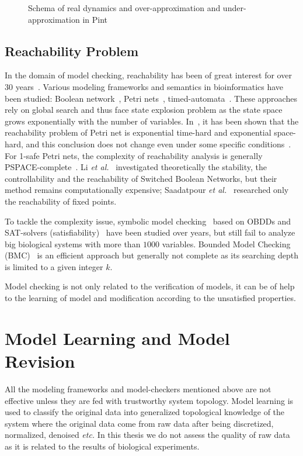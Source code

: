 \begin{figure}[ht]
    \centering
    
    \caption[Static analysis]{Schema of real dynamics and over-approximation and under-approximation in Pint}
    \label{fig:vennDiagram}
\end{figure}

\subsection{Reachability Problem}
In the domain of model checking, reachability has been of great interest for over 30 years~\cite{clarke2008birth,clarke20142}. 
Various modeling frameworks and semantics in bioinformatics have been studied: Boolean network~\cite{akutsu2007control}, Petri nets~\cite{mayr1984,esparza1998}, timed-automata~\cite{Daws1998,wozna2003}. 
These approaches rely on global search and thus face state explosion problem as the state space grows exponentially with the number of variables. 
In~\cite{peterson1977petri}, it has been shown that the reachability problem of Petri net is exponential time-hard and exponential space-hard, and this conclusion does not change even under some specific conditions~\cite{esparza1998}. 
For 1-safe Petri nets, the complexity of reachability analysis is generally PSPACE-complete~\cite{cheng1995complexity}.
Li \textit{et al.}~\cite{li2012reachability,li2014stability} investigated theoretically the stability, the controllability and the reachability of Switched Boolean Networks, but their method remains computationally expensive;
Saadatpour \textit{et al.}~\cite{saadatpour2010attractor} researched only the reachability of fixed points.

To tackle the complexity issue, symbolic model checking~\cite{burch1992symbolic} based on OBDDs and SAT-solvers (satisfiability)~\cite{abdulla2000symbolic} have been studied over years, but still fail to analyze big biological systems with more than $1000$ variables. 
Bounded Model Checking (BMC)~\cite{clarke2001bounded} is an efficient approach but generally not complete as its searching depth is limited to a given integer $k$.

Model checking is not only related to the verification of models, it can be of help to the learning of model and modification according to the unsatisfied properties.

\section{Model Learning and Model Revision}
All the modeling frameworks and model-checkers mentioned above are not effective unless they are fed with trustworthy system topology.
Model learning is used to classify the original data into generalized topological knowledge of the system where the original data come from raw data after being discretized, normalized, denoised \textit{etc.}
In this thesis we do not assess the quality of raw data as it is related to the results of biological experiments.

